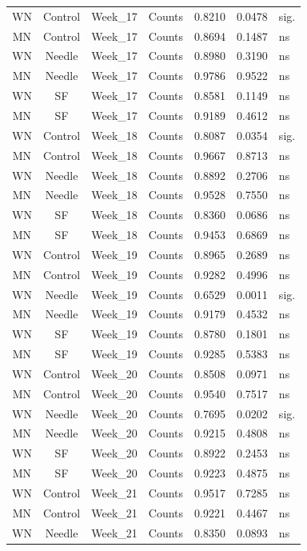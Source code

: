 \documentclass[
  12pt,
  letterpaper,
]{article}
\begin{document}
\begin{longtable}{ccclrrl}
WN & Control & Week\_17 & Counts & 0.8210 & 0.0478 & sig. \\ 
MN & Control & Week\_17 & Counts & 0.8694 & 0.1487 & ns \\ 
WN & Needle & Week\_17 & Counts & 0.8980 & 0.3190 & ns \\ 
MN & Needle & Week\_17 & Counts & 0.9786 & 0.9522 & ns \\ 
WN & SF & Week\_17 & Counts & 0.8581 & 0.1149 & ns \\ 
MN & SF & Week\_17 & Counts & 0.9189 & 0.4612 & ns \\ 
WN & Control & Week\_18 & Counts & 0.8087 & 0.0354 & sig. \\ 
MN & Control & Week\_18 & Counts & 0.9667 & 0.8713 & ns \\ 
WN & Needle & Week\_18 & Counts & 0.8892 & 0.2706 & ns \\ 
MN & Needle & Week\_18 & Counts & 0.9528 & 0.7550 & ns \\ 
WN & SF & Week\_18 & Counts & 0.8360 & 0.0686 & ns \\ 
MN & SF & Week\_18 & Counts & 0.9453 & 0.6869 & ns \\ 
WN & Control & Week\_19 & Counts & 0.8965 & 0.2689 & ns \\ 
MN & Control & Week\_19 & Counts & 0.9282 & 0.4996 & ns \\ 
WN & Needle & Week\_19 & Counts & 0.6529 & 0.0011 & sig. \\ 
MN & Needle & Week\_19 & Counts & 0.9179 & 0.4532 & ns \\ 
WN & SF & Week\_19 & Counts & 0.8780 & 0.1801 & ns \\ 
MN & SF & Week\_19 & Counts & 0.9285 & 0.5383 & ns \\ 
WN & Control & Week\_20 & Counts & 0.8508 & 0.0971 & ns \\ 
MN & Control & Week\_20 & Counts & 0.9540 & 0.7517 & ns \\ 
WN & Needle & Week\_20 & Counts & 0.7695 & 0.0202 & sig. \\ 
MN & Needle & Week\_20 & Counts & 0.9215 & 0.4808 & ns \\ 
WN & SF & Week\_20 & Counts & 0.8922 & 0.2453 & ns \\ 
MN & SF & Week\_20 & Counts & 0.9223 & 0.4875 & ns \\ 
WN & Control & Week\_21 & Counts & 0.9517 & 0.7285 & ns \\ 
MN & Control & Week\_21 & Counts & 0.9221 & 0.4467 & ns \\ 
WN & Needle & Week\_21 & Counts & 0.8350 & 0.0893 & ns \\ 

\end{longtable}
\end{document}
